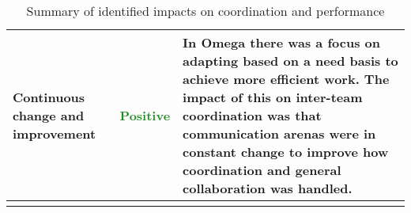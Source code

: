 \begin{center}
\begin{longtable}{| p{4cm} | p{2cm} | p{8.5cm} |}
	Continuous change and improvement & \textcolor{ForestGreen}{Positive} & In Omega there was a focus on adapting based on a need basis to achieve more efficient work. The impact of this on inter-team coordination was that communication arenas were in constant change to improve how coordination and general collaboration was handled. \\ \hline
	\caption{Summary of identified impacts on coordination and performance}
	\label{conclusion_final}
	\end{longtable}
\end{center}
